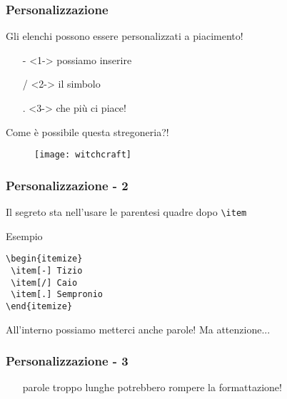 \begin{frame}
 \frametitle{Personalizzazione}
 
 Gli elenchi possono essere personalizzati a piacimento!
 \begin{itemize}
  \item[-]<1-> possiamo inserire
  \item[/]<2-> il simbolo
  \item[.]<3-> che più ci piace!
 \end{itemize}

\end{frame}

\begin{frame}
 
 \begin{center}
  \huge Come è possibile questa stregoneria?!
 \end{center}
 
 \begin{figure}[h]
  \centering
  \texttt{[image: witchcraft]}
 \end{figure}

 
  

\end{frame}

\begin{frame}[fragile]
 \frametitle{Personalizzazione - 2}
 
 Il segreto sta nell'usare le parentesi quadre dopo \texttt{\textbackslash item}
 
 \begin{exampleblock}{Esempio}
 \begin{lstlisting}[frame = single, title={Una lista puntata personalizzata}] 
\begin{itemize}
 \item[-] Tizio
 \item[/] Caio
 \item[.] Sempronio
\end{itemize}
  \end{lstlisting}
 \end{exampleblock}
 
 All'interno possiamo metterci anche parole! Ma attenzione...
\end{frame}

\begin{frame}
 \frametitle{Personalizzazione - 3}
 
 \begin{itemize}
  \item[parole troppo lunghe] potrebbero rompere la formattazione!
 \end{itemize}

\end{frame}
